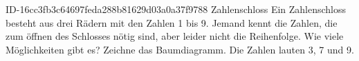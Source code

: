 \begin{exercise}
      {ID-16cc3fb3c64697feda288b81629d03a0a37f9788}
      {Zahlenschloss}
  \ifproblem\problem
    Ein Zahlenschloss besteht aus drei Rädern mit den Zahlen 1 bis 9. Jemand kennt
    die Zahlen, die zum öffnen des Schlosses nötig sind, aber leider nicht die
    Reihenfolge. Wie viele Möglichkeiten gibt es? Zeichne das Baumdiagramm.
    Die Zahlen lauten 3, 7 und 9.
  \fi
\end{exercise}
